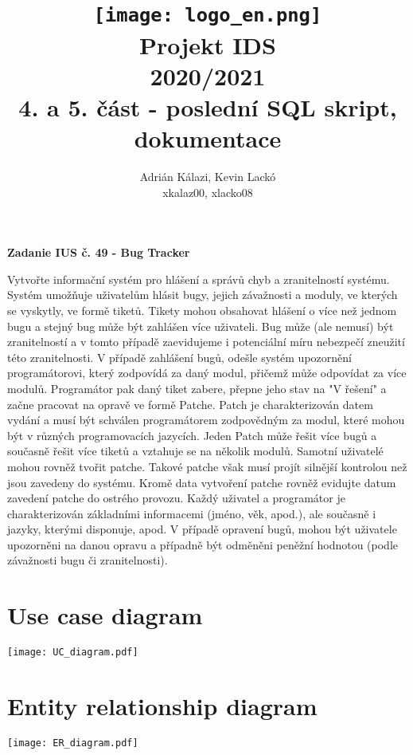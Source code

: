 \documentclass[11pt, a4paper]{article}
\title{\texttt{[image: logo\_en.png]}\vspace{1cm}\\\huge{Projekt IDS\\2020/2021}\\\vspace{1cm}4. a 5. část - poslední SQL skript, dokumentace}
\author{Adrián Kálazi, Kevin Lackó\\xkalaz00, xlacko08}
\date{}
\begin{document}
	
	\maketitle

	\bigskip

	\begin{center}
		\textbf{\Large{Zadanie IUS č. 49 - Bug Tracker}}
	\end{center}

	Vytvořte informační systém pro hlášení a správů chyb a zranitelností systému.
	Systém umožňuje uživatelům hlásit bugy, jejich závažnosti a moduly, ve kterých se vyskytly, ve formě tiketů.
	Tikety mohou obsahovat hlášení o více než jednom bugu a stejný bug může být zahlášen více uživateli.
	Bug může (ale nemusí) být zranitelností a v tomto případě zaevidujeme i potenciální míru nebezpečí zneužití této zranitelnosti.
	V případě zahlášení bugů, odešle systém upozornění programátorovi, který zodpovídá za daný modul, přičemž může odpovídat za více modulů.
	Programátor pak daný tiket zabere, přepne jeho stav na "V řešení" a začne pracovat na opravě ve formě Patche.
	Patch je charakterizován datem vydání a musí být schválen programátorem zodpovědným za modul, které mohou být v různých programovacích jazycích.
	Jeden Patch může řešit více bugů a současně řešit více tiketů a vztahuje se na několik modulů.
	Samotní uživatelé mohou rovněž tvořit patche.
	Takové patche však musí projít silnější kontrolou než jsou zavedeny do systému.
	Kromě data vytvoření patche rovněž evidujte datum zavedení patche do ostrého provozu.
	Každý uživatel a programátor je charakterizován základními informacemi (jméno, věk, apod.), ale současně i jazyky, kterými disponuje, apod.
	V případě opravení bugů, mohou být uživatele upozorněni na danou opravu a případně být odměněni peněžní hodnotou (podle závažnosti bugu či zranitelnosti).


	\newpage
	\section{Use case diagram}
	\begin{center}
		\vspace*{\fill}
		\texttt{[image: UC\_diagram.pdf]}
		\vspace*{\fill}
	\end{center}

	\newpage
	\section{Entity relationship diagram}
	\begin{center}
		\vspace*{\fill}
		\texttt{[image: ER\_diagram.pdf]}
		\vspace*{\fill}
	\end{center}
\end{document}
